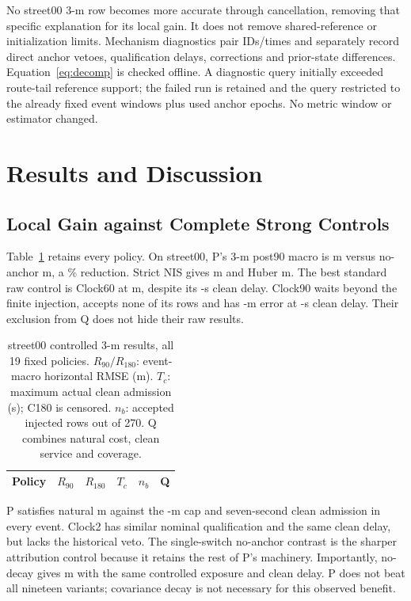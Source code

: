 \documentclass[conference]{IEEEtran}
\begin{document}
No street00 3-m row becomes more accurate through cancellation, removing that specific explanation for its local gain. It does not remove shared-reference or initialization limits. Mechanism diagnostics pair IDs/times and separately record direct anchor vetoes, qualification delays, corrections and prior-state differences. Equation~\eqref{eq:decomp} is checked offline. A diagnostic query initially exceeded route-tail reference support; the failed run is retained and the query restricted to the already fixed event windows plus used anchor epochs. No metric window or estimator changed.

\section{Results and Discussion}
\subsection{Local Gain against Complete Strong Controls}
Table~\ref{tab:street} retains every policy. On street00, P's 3-m post90 macro is  m versus no-anchor  m, a \% reduction. Strict NIS gives  m and Huber  m. The best standard raw control is Clock60 at  m, despite its -s clean delay. Clock90 waits beyond the finite injection, accepts none of its rows and has -m error at -s clean delay. Their exclusion from Q does not hide their raw results.

\begin{table}[t]
\caption{street00 controlled 3-m results, all 19 fixed policies. $R_{90}/R_{180}$: event-macro horizontal RMSE (m). $T_c$: maximum actual clean admission (s); C180 is censored. $n_b$: accepted injected rows out of 270. Q combines natural cost, clean service and coverage.}\label{tab:street}
\centering\small\setlength{\tabcolsep}{3pt}
\begin{tabular}{lrrrrc}\toprule
Policy & $R_{90}$ & $R_{180}$ & $T_c$ & $n_b$ & Q\\\midrule

\bottomrule\end{tabular}
\end{table}

P satisfies natural  m against the -m cap and seven-second clean admission in every event. Clock2 has similar nominal qualification and the same clean delay, but lacks the historical veto. The single-switch no-anchor contrast is the sharper attribution control because it retains the rest of P's machinery. Importantly, no-decay gives  m with the same controlled exposure and clean delay. P does not beat all nineteen variants; covariance decay is not necessary for this observed benefit.
\end{document}
